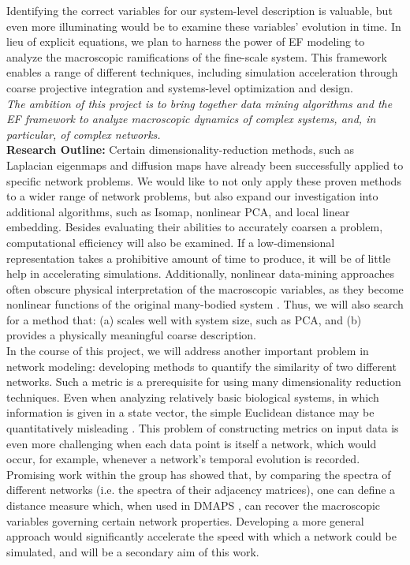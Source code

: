 \documentclass[11pt]{article}
\begin{document}
\indent Identifying the correct variables for our system-level description is valuable, but even more illuminating would be to examine these variables' evolution in time. In lieu of explicit equations, we plan to harness the power of EF modeling to analyze the macroscopic ramifications of the fine-scale system. This framework enables a range of different techniques, including simulation acceleration through coarse projective integration and systems-level optimization and design.\\
\indent \textit{The ambition of this project is to bring together data mining algorithms and the EF framework to analyze macroscopic dynamics of complex systems, and, in particular, of complex networks.}\\
\textbf{Research Outline:}  Certain dimensionality-reduction methods, such as Laplacian eigenmaps and diffusion maps have already been successfully applied to specific network problems. We would like to not only apply these proven methods to a wider range of network problems, but also expand our investigation into additional algorithms, such as Isomap, nonlinear PCA, and local linear embedding. Besides evaluating their abilities to accurately coarsen a problem, computational efficiency will also be examined. If a low-dimensional representation takes a prohibitive amount of time to produce, it will be of little help in accelerating simulations. Additionally, nonlinear data-mining approaches often obscure physical interpretation of the macroscopic variables, as they become nonlinear functions of the original many-bodied system \cite{Ferguson2011}. Thus, we will also search for a method that: (a) scales well with system size, such as PCA, and (b) provides a physically meaningful coarse description. \\
\indent In the course of this project, we will address another important problem in network modeling: developing methods to quantify the similarity of two different networks. Such a metric is a prerequisite for using many dimensionality reduction techniques. Even when analyzing relatively basic biological systems, in which information is given in a state vector, the simple Euclidean distance may be quantitatively misleading \cite{Bold2007}. This problem of constructing metrics on input data is even more challenging when each data point is itself a network, which would occur, for example, whenever a network's temporal evolution is recorded. Promising work within the group has showed that, by comparing the spectra of different networks (i.e. the spectra of their adjacency matrices), one can define a distance measure which, when used in DMAPS \cite{Coifman2006}, can recover the macroscopic variables governing certain network properties. Developing a more general approach would significantly accelerate the speed with which a network could be simulated, and will be a secondary aim of this work.\\
\end{document}
